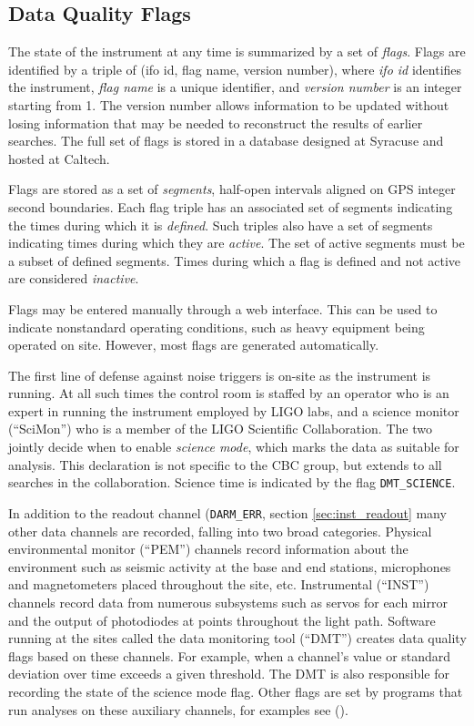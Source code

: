 
\subsection{Data Quality Flags}

The state of the instrument at any time is summarized by a set of
\emph{flags}.  Flags are identified by a triple of (ifo id, flag name,
version number), where \emph{ifo id} identifies the instrument,
\emph{flag name} is a unique identifier, and \emph{version number} is
an integer starting from 1.  The version number allows information to
be updated without losing information that may be needed to
reconstruct the results of earlier searches.  The full set of flags is
stored in a database designed at Syracuse and hosted at Caltech.

Flags are stored as a set of \emph{segments}, half-open intervals
aligned on GPS integer second boundaries.  Each flag triple has an
associated set of segments indicating the times during which it is
\emph{defined}.  Such triples also have a set of segments indicating
times during which they are \emph{active}.  The set of active segments
must be a subset of defined segments.  Times during which a flag is
defined and not active are considered \emph{inactive}.

Flags may be entered manually through a web interface.  This can be
used to indicate nonstandard operating conditions, such as heavy
equipment being operated on site.  However, most flags are generated
automatically.

The first line of defense against noise triggers is on-site as the
instrument is running.  At all such times the control room is staffed
by an operator who is an expert in running the instrument employed by
LIGO labs, and a science monitor (``SciMon'') who is a member of the
LIGO Scientific Collaboration.  The two jointly decide when to enable
\emph{science mode}, which marks the data as suitable for analysis.
This declaration is not specific to the CBC group, but extends to all
searches in the collaboration.  Science time is indicated by the flag
\texttt{DMT\_SCIENCE}.

In addition to the readout channel (\texttt{DARM\_ERR}, section
\ref{sec:inst_readout} many other data channels are recorded, falling
into two broad categories.  Physical environmental monitor (``PEM'')
channels record information about the environment such as seismic
activity at the base and end stations, microphones and magnetometers
placed throughout the site, etc.  Instrumental (``INST'') channels
record data from numerous subsystems such as servos for each mirror
and the output of photodiodes at points throughout the light path.
Software running at the sites called the data monitoring tool
(``DMT'') creates data quality flags based on these channels.  For
example, when a channel's value or standard deviation over time
exceeds a given threshold.  The DMT is also responsible for recording
the state of the science mode flag.  Other flags are set by programs
that run analyses on these auxiliary channels, for examples see
().


